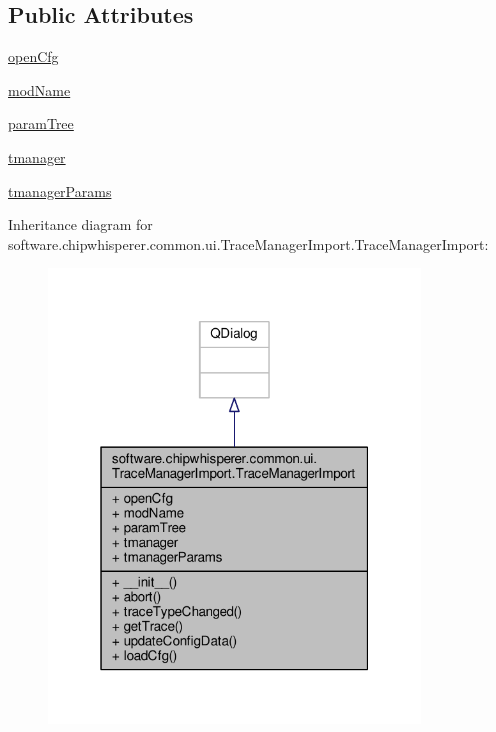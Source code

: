 \subsection*{Public Attributes}
\begin{DoxyCompactItemize}
\item 
\hyperlink{classsoftware_1_1chipwhisperer_1_1common_1_1ui_1_1TraceManagerImport_1_1TraceManagerImport_a7e76137b976850a70682c0fcbba90421}{open\+Cfg}
\item 
\hyperlink{classsoftware_1_1chipwhisperer_1_1common_1_1ui_1_1TraceManagerImport_1_1TraceManagerImport_a8bc8b909c880c689eb9615411cf0ef2c}{mod\+Name}
\item 
\hyperlink{classsoftware_1_1chipwhisperer_1_1common_1_1ui_1_1TraceManagerImport_1_1TraceManagerImport_a101c02d08da91a4978fc7abd5208bc9b}{param\+Tree}
\item 
\hyperlink{classsoftware_1_1chipwhisperer_1_1common_1_1ui_1_1TraceManagerImport_1_1TraceManagerImport_a4aaf95a811103994cb4e13fadfd669f9}{tmanager}
\item 
\hyperlink{classsoftware_1_1chipwhisperer_1_1common_1_1ui_1_1TraceManagerImport_1_1TraceManagerImport_ac667ae7eb9674002477bf0d6df4a64de}{tmanager\+Params}
\end{DoxyCompactItemize}


Inheritance diagram for software.\+chipwhisperer.\+common.\+ui.\+Trace\+Manager\+Import.\+Trace\+Manager\+Import\+:\nopagebreak
\begin{figure}[H]
\begin{center}
\leavevmode
\includegraphics[width=280pt]{d8/d5b/classsoftware_1_1chipwhisperer_1_1common_1_1ui_1_1TraceManagerImport_1_1TraceManagerImport__inherit__graph}
\end{center}
\end{figure}


